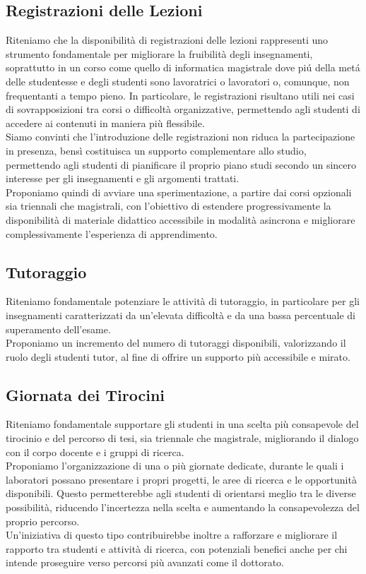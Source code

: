 \documentclass[12pt,a4paper]{article}
\begin{document}
\subsection{Registrazioni delle Lezioni}
Riteniamo che la disponibilità di registrazioni delle lezioni rappresenti uno strumento fondamentale per migliorare la fruibilità degli insegnamenti, soprattutto in un corso come quello di informatica magistrale dove piú della metá delle studentesse e degli studenti
sono lavoratrici o lavoratori o, comunque, non frequentanti a tempo pieno. In particolare, le registrazioni  risultano utili nei casi di sovrapposizioni tra corsi o difficoltà organizzative, permettendo agli studenti di accedere ai contenuti in maniera più flessibile.
\\Siamo convinti che l’introduzione delle registrazioni non riduca la partecipazione in presenza, bensì costituisca un supporto complementare allo studio, permettendo agli studenti di pianificare il proprio piano studi secondo un sincero interesse per gli insegnamenti e gli argomenti trattati.
\\Proponiamo quindi di avviare una sperimentazione, a partire dai corsi opzionali sia triennali che magistrali, con l’obiettivo di estendere progressivamente la disponibilità di materiale didattico accessibile in modalità asincrona e migliorare complessivamente l’esperienza di apprendimento.

\subsection{Tutoraggio}
Riteniamo fondamentale potenziare le attività di tutoraggio, in particolare per gli insegnamenti caratterizzati da un'elevata difficoltà e da una bassa percentuale di superamento dell'esame.
\\Proponiamo un incremento del numero di tutoraggi disponibili, valorizzando il ruolo degli studenti tutor, al fine di offrire un supporto più accessibile e mirato.

\subsection{Giornata dei Tirocini}
Riteniamo fondamentale supportare gli studenti in una scelta più consapevole del tirocinio e del percorso di tesi, sia triennale che magistrale, migliorando il dialogo con il corpo docente e i gruppi di ricerca.
\\Proponiamo l’organizzazione di una o più giornate dedicate, durante le quali i laboratori possano presentare i propri progetti, le aree di ricerca e le opportunità disponibili. Questo permetterebbe agli studenti di orientarsi meglio tra le diverse possibilità, riducendo l’incertezza nella scelta e aumentando la consapevolezza del proprio percorso.
\\Un’iniziativa di questo tipo contribuirebbe inoltre a rafforzare e migliorare il rapporto tra studenti e attività di ricerca, con potenziali benefici anche per chi intende proseguire verso percorsi più avanzati come il dottorato.
\end{document}
